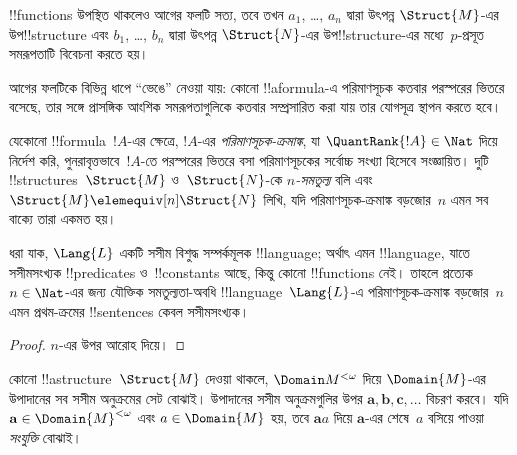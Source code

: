 \documentclass[../../../include/open-logic-section]{subfiles}
\begin{document}
\begin{rem}
!!{function}s উপস্থিত থাকলেও আগের ফলটি সত্য, তবে তখন $a_1$, \dots,
$a_n$ দ্বারা উৎপন্ন $\Struct{M}$-এর উপ!!{structure} এবং $b_1$, \dots,
$b_n$ দ্বারা উৎপন্ন $\Struct{N}$-এর উপ!!{structure}-এর মধ্যে~$p$-প্রসূত
সমরূপতাটি বিবেচনা করতে হয়।
\end{rem}

আগের ফলটিকে বিভিন্ন ধাপে “ভেঙে” নেওয়া যায়: কোনো !!a{formula}-এ
পরিমাণসূচক কতবার পরস্পরের ভিতরে বসেছে, তার সঙ্গে প্রাসঙ্গিক আংশিক
সমরূপতাগুলিকে কতবার সম্প্রসারিত করা যায় তার যোগসূত্র স্থাপন করতে হবে।

\begin{defn}
  যেকোনো !!{formula}~$!A$-এর ক্ষেত্রে, $!A$-এর
  \emph{পরিমাণসূচক-ক্রমাঙ্ক}, যা $\QuantRank{!A} \in \Nat$ দিয়ে নির্দেশ
  করি, পুনরাবৃত্তভাবে~$!A$-তে
  পরস্পরের ভিতরে বসা পরিমাণসূচকের সর্বোচ্চ সংখ্যা হিসেবে সংজ্ঞায়িত।
  দুটি !!{structure}s~$\Struct{M}$ ও~$\Struct{N}$-কে
  \emph{$n$-সমতুল্য} বলি এবং $\Struct{M} \elemequiv[n] \Struct{N}$
  লিখি, যদি পরিমাণসূচক-ক্রমাঙ্ক বড়জোর~$n$ এমন সব বাক্যে তারা একমত হয়।
\end{defn}

\begin{prop}
  ধরা যাক, $\Lang{L}$ একটি সসীম বিশুদ্ধ সম্পর্কমূলক !!{language}; অর্থাৎ
  এমন !!{language}, যাতে সসীমসংখ্যক !!{predicate}s ও~!!{constant}s আছে,
  কিন্তু কোনো !!{function}s নেই। তাহলে প্রত্যেক $n \in \Nat$-এর জন্য
  যৌক্তিক সমতুল্যতা-অবধি !!{language}~$\Lang{L}$-এ পরিমাণসূচক-ক্রমাঙ্ক
  বড়জোর~$n$ এমন প্রথম-ক্রমের !!{sentence}s কেবল সসীমসংখ্যক।
\end{prop}

\begin{proof}
  $n$-এর উপর আরোহ দিয়ে।
\end{proof}

\begin{defn}
  কোনো !!a{structure}~$\Struct{M}$ দেওয়া থাকলে, $\Domain M^{<\omega}$
  দিয়ে $\Domain{M}$-এর উপাদানের সব সসীম অনুক্রমের সেট বোঝাই।
  উপাদানের সসীম অনুক্রমগুলির উপর $\mathbf{a}, \mathbf{b}, \mathbf{c},
  \ldots$ বিচরণ করবে। যদি $\mathbf{a} \in
  \Domain{M}^{<\omega}$ এবং $a \in \Domain{M}$ হয়, তবে
  $\mathbf{a}a$ দিয়ে $\mathbf{a}$-এর শেষে~$a$ বসিয়ে পাওয়া
  \emph{সংযুক্তি} বোঝাই।
\end{defn}
\end{document}
